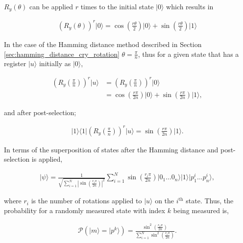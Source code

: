 $ R_y\left(\theta \right) $ can be applied $r$ times to the initial state $\vert 0 \rangle$ which results in

\begin{align}
    \left(R_y\left(\theta \right)\right) ^r \vert 0 \rangle 
    =
    \cos\left(\frac{r\theta}{2}\right)\vert 0 \rangle + \sin\left(\frac{r\theta}{2}\right)\vert 1 \rangle 
\end{align}

In the case of the Hamming distance method described in Section \ref{sec:hamming_distance_cry_rotation} $\theta = \frac{\pi}{n}$, thus for a given state that has a register $\vert u \rangle$ initially as $\vert 0 \rangle$,

\begin{align}
    \left(R_y\left(\frac{\pi}{n} \right)\right) ^r \vert u \rangle 
    &=
    \left(R_y\left(\frac{\pi}{n} \right)\right) ^r \vert 0 \rangle\\
    &=
    \cos\left(\frac{r\pi}{2n}\right)\vert 0 \rangle + \sin\left(\frac{r\pi}{2n}\right)\vert 1 \rangle,        
\end{align}

\noindent and after post-selection;

\begin{align}
    \vert 1 \rangle \langle 1\vert \left(R_y\left(\frac{\pi}{n} \right)\right) ^r \vert u \rangle
    =
    \sin\left(\frac{r\pi}{2n}\right)\vert 1 \rangle.        
\end{align}

In terms of the superposition of states after the Hamming distance and post-selection is applied,

\begin{align*}
    \vert \psi \rangle = \frac{1}{\sqrt{\sum\limits_{i=1}^{N} \left| \sin\left( \frac{r_i\pi}{2n} \right)\right|^2}}\sum\limits_{i=1}^{N} \sin\left(\frac{r_i\pi}{2n}\right) \vert 0_{1}\dots 0_{n} \rangle\vert 1 \rangle \vert p_1^{i}\dots p_n^{i} \rangle ,
\end{align*}

\noindent where $r_i$ is the number of rotations applied to $\vert u\rangle$ on the $i^{\textrm{th}}$ state. Thus, the probability for a randomly measured state with index $k$ being measured is,

\begin{align}
    \mathcal{P}\left( \vert m \rangle = \vert p^k \rangle \right) 
    =
    \frac{\sin^2\left(\frac{r_k\pi}{2n}\right)}{\sum\limits_{i=1}^{N}  \sin^2\left( \frac{r_i\pi}{2n} \right)}.
\end{align}

\iffalse

\noindent From this we can compute the binary distance $r_k$;

\begin{align}
    r_k = \frac{2n}{\pi}\sin^{-1}\left( \sqrt{\frac{\mathcal{P}\left( \vert m \rangle = \vert p^i \rangle \right)}{1-\mathcal{P}\left( \vert m \rangle = \vert p^i \rangle \right)}\displaystyle\sum\limits_{\substack{i=1\\ i\neq k}}^{N}  \sin^2\left( \frac{r_i\pi}{2n} \right) } \right).
\end{align}
\fi 
